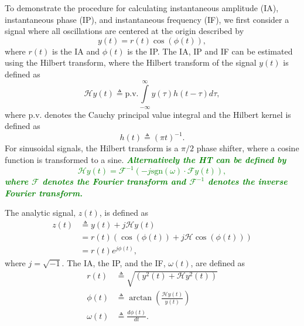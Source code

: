 \documentclass[a4paper]{IEEEtran}
\newcommand{\dean}[1]{\textsf{\emph{\textbf{\textcolor{green}{#1}}}}}
\begin{document}
To demonstrate the procedure for calculating instantaneous amplitude (IA), instantaneous phase (IP), and instantaneous frequency (IF), we first consider a signal where all oscillations are centered at the origin described by
\begin{equation}
	y(t) = r(t)\cos(\phi(t)),
\end{equation}
where $r(t)$ is the IA and $\phi(t)$ is the IP. The IA, IP and IF can be estimated using the Hilbert transform, where the Hilbert transform of the signal $y(t)$ is defined as
\begin{equation}\label{eq:HilbertTransform}
	\mathcal{H}y\left( t \right) \triangleq \textrm{p.v.}\int\limits_{ - \infty }^\infty  {y\left( \tau  \right)h\left( {t - \tau } \right)} d\tau,
\end{equation}
where $\textrm{p.v.}$ denotes the Cauchy principal value integral and the Hilbert kernel is defined as
\begin{equation}\label{eq:HilbertKernel}
	h\left( t \right) \triangleq {\left( {\pi t} \right)^{ - 1}}.
\end{equation}
For sinusoidal signals, the Hilbert transform is a $\pi/2$ phase shifter, where a cosine function is transformed to a sine. \dean{Alternatively the HT can be defined by
\begin{equation}
	\mathcal{H}y\left( t \right) = \mathcal{F}^{-1}(-j\textrm{sgn}(\omega)\cdot\mathcal{F}y(t)),
\end{equation}
where $\mathcal{F}$ denotes the Fourier transform and $\mathcal{F}^{-1}$ denotes the inverse Fourier transform.}

The analytic signal, $z(t)$, is defined as
\begin{align}\label{eq:AnalyticSignal}
	z\left( t \right) &\triangleq y\left( t \right) + j\mathcal{H}y\left( t \right) \\
    &= r\left( t \right)\left(\cos\left(\phi\left(t\right)\right) + j \mathcal{H}\cos\left(\phi\left(t\right)\right)\right) \\
&= r\left( t \right){e^{j\phi \left( t \right)}},
\end{align}
where $j=\sqrt{-1}$. The IA, the IP, and the IF, $\omega(t)$, are defined as
\begin{align}
	r(t) &\triangleq \sqrt{\left(y^2(t) + \mathcal{H}y^2(t)\right)}\label{eq:IAdef}\\
	\phi(t) &\triangleq \arctan\left(\frac{\mathcal{H}y\left( t \right)}{y\left(t\right)}\right) \label{eq:IPdef}\\
\omega \left( t \right) &\triangleq \frac{d\phi \left( t \right)}{dt}. \label{eq:IFdef}
\end{align}
\end{document}
